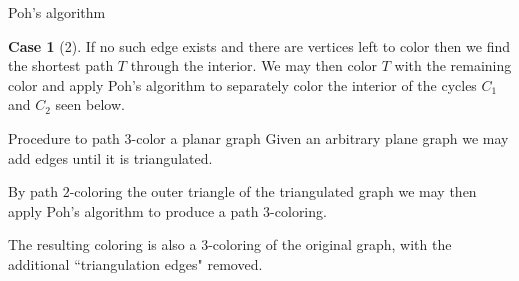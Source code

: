 \documentclass[pdf]{beamer}
\theoremstyle{definition}
\theoremstyle{definition}
\theoremstyle{definition}
\theoremstyle{definition}
\theoremstyle{definition}
\theoremstyle{definition}
\theoremstyle{definition}
\theoremstyle{definition}
\theoremstyle{definition}
\theoremstyle{definition}
\theoremstyle{definition}
\theoremstyle{definition}
\newtheorem{cse}{Case}
\begin{document}
\begin{frame}{Poh's algorithm}
\begin{cse}[2]
If no such edge exists and there are vertices left to color then we find
the shortest path $T$ through the interior. We may then color $T$ with the
remaining color and apply Poh's algorithm to separately color the interior
of the cycles $C_1$ and $C_2$ seen below.
\end{cse}

\begin{center}
\end{center}
\end{frame}

\begin{frame}{Procedure to path $3$-color a planar graph}
Given an arbitrary plane graph we may add edges until it is triangulated.

By path $2$-coloring the outer triangle of the triangulated graph we may then
apply Poh's algorithm to produce a path $3$-coloring.

The resulting coloring is also a $3$-coloring of the original graph, with the
additional ``triangulation edges" removed.
\end{frame}
\end{document}

